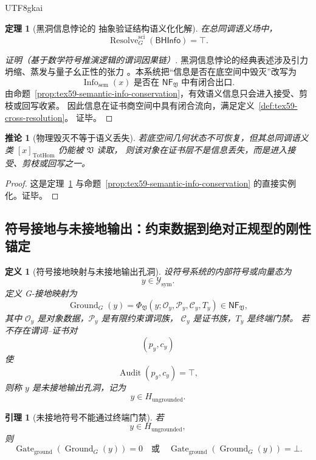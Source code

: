\documentclass[12pt]{article}
\newtheorem{definition}{定义}[section]
\newtheorem{theorem}{定理}[section]
\newtheorem{corollary}{推论}[section]
\newtheorem{lemma}{引理}[section]
\newcommand{\Vsys}{\mathfrak V}
\newcommand{\NF}{\mathsf{NF}}
\DeclareMathOperator{\Audit}{Audit}
\DeclareMathOperator{\Resolve}{Resolve}
\DeclareMathOperator{\Gate}{Gate}
\DeclareMathOperator{\TotHom}{TotHom}
\DeclareMathOperator{\Ground}{Ground}
\DeclareMathOperator{\Info}{Info}
\begin{document}
\begin{CJK*}{UTF8}{gkai}
\begin{theorem}[黑洞信息悖论的 抽象验证结构语义化化解]
\label{thm:tex59-bhinfo-resolution}
在总同调语义场中，
\[
  \Resolve_G^{\mathrm{sci}}(\mathsf{BHInfo})=\top.
\]
\end{theorem}

\begin{proof}[证明（基于数学符号推演逻辑的谓词因果链）]
黑洞信息悖论的经典表述涉及引力坍缩、蒸发与量子幺正性的张力
\cite{Hawking1976Breakdown}。本系统把“信息是否在底空间中毁灭”改写为
\[
  \Info_{\mathrm{sem}}(x)
  \text{ 是否在 }\NF_{\Vsys}\text{ 中有闭合出口}.
\]
由命题~\ref{prop:tex59-semantic-info-conservation}，有效语义信息只会进入接受、剪枝或回写收紧。
因此信息在证书商空间中具有闭合流向，满足定义~\ref{def:tex59-cross-resolution}。
证毕。
\end{proof}

\begin{corollary}[物理毁灭不等于语义丢失]
\label{cor:tex59-physical-destroy-semantic-survive}
若底空间几何状态不可恢复，但其总同调语义类 \([x]_{\TotHom}\) 仍能被 \(\Vsys\) 读取，
则该对象在证书层不是信息丢失，而是进入接受、剪枝或回写之一。
\end{corollary}

\begin{proof}
这是定理~\ref{thm:tex59-bhinfo-resolution} 与命题~\ref{prop:tex59-semantic-info-conservation}
的直接实例化。证毕。
\end{proof}

\subsection{符号接地与未接地输出：约束数据到绝对正规型的刚性锚定}
\label{subsec:tex59-symbol-grounding}

\begin{definition}[符号接地映射与未接地输出孔洞]
\label{def:tex59-grounding-map}
设符号系统的内部符号或向量态为
\[
  y\in\mathcal Y_{\mathrm{sym}}.
\]
定义 G-接地映射为
\[
  \Ground_G(y)
  =
  \Phi_{\Vsys}(y;\mathcal O_y,\mathcal P_y,\mathcal C_y,T_y)
  \in\NF_{\Vsys},
\]
其中 \(\mathcal O_y\) 是对象数据，\(\mathcal P_y\) 是有限约束谓词族，
\(\mathcal C_y\) 是证书族，\(T_y\) 是终端门禁。
若不存在谓词--证书对
\[
  (p_y,c_y)
\]
使
\[
  \Audit(p_y,c_y)=\top,
\]
则称 \(y\) 是未接地输出孔洞，记为
\[
  y\in H_{\mathrm{ungrounded}}.
\]
\end{definition}

\begin{lemma}[未接地符号不能通过终端门禁]
\label{lem:tex59-ungrounded-blocked}
若
\[
  y\in H_{\mathrm{ungrounded}},
\]
则
\[
  \Gate_{\mathrm{ground}}(\Ground_G(y))=0
  \quad\text{或}\quad
  \Gate_{\mathrm{ground}}(\Ground_G(y))=\bot.
\]
\end{lemma}


\end{CJK*}
\end{document}

